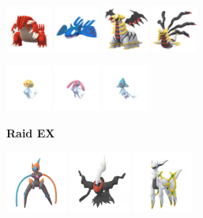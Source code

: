 \documentclass[12pt]{beamer}
\begin{document}
\begin{frame}
\begin{block}{}
\begin{footnotesize}
\begin{center}
 \includegraphics[width=1.5cm]{../../images/pokemon/groudon.png}\quad\quad
 \includegraphics[width=1.5cm]{../../images/pokemon/kyogre.png}\quad\quad
 \includegraphics[width=1.5cm]{../../images/pokemon/giratina_a.png}\quad\quad
 \includegraphics[width=1.5cm]{../../images/pokemon/giratina_o.png}
 
 \includegraphics[width=1.5cm]{../../images/pokemon/uxie.png}\quad\quad
 \includegraphics[width=1.5cm]{../../images/pokemon/mesprit.png}\quad\quad
 \includegraphics[width=1.5cm]{../../images/pokemon/azelf.png}
 


\bigskip\bigskip

\textbf{Raid EX}

 \includegraphics[width=2cm]{../../images/pokemon/deoxys_s.png}\quad\quad
 \includegraphics[width=2cm]{../../images/pokemon/darkrai.png}\quad\quad
 \includegraphics[width=2cm]{../../images/pokemon/arceus_neutral.png} 


\end{center}
\end{footnotesize}
\end{block}
\end{frame}
\end{document}

